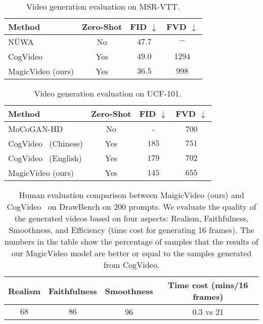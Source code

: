 \documentclass[10pt,twocolumn,letterpaper]{article}
\begin{document}
\begin{table}[t]
\small
\caption{Video generation evaluation on MSR-VTT. }
\label{tab:msrvtt}
\centering
\begin{tabular}{@{}l|ccc@{}}
Method & Zero-Shot  & FID $\downarrow$ & FVD $\downarrow$  \\
\toprule
NÜWA~\cite{wu2022nuwa} & No &  $47.7$ & $-$ \\
CogVideo~\cite{CogVideo}  & Yes &  $49.0$ & $1294$ \\
MagicVideo (ours) & Yes & $36.5$ & $998$ \\
\end{tabular}
\end{table}



\begin{table}[h]
\small
\caption{Video generation evaluation on UCF-101. }
\label{tab:ucf101}
\centering
\begin{tabular}{@{}l|ccc@{}}
Method & Zero-Shot  & FID $\downarrow$ & FVD $\downarrow$  \\
\toprule
MoCoGAN-HD\cite{tian2021good} & No & - & 700 \\
CogVideo~\cite{CogVideo} (Chinese) & Yes &  $185$ & $751$ \\
CogVideo~\cite{CogVideo} (English) & Yes &  $179 $ & $702$ \\
MagicVideo (ours) & Yes  & $145$ & $655$ \\
\end{tabular}
\end{table}



\begin{table}[t]
\caption{Human evaluation comparison between MaigicVideo (ours) and CogVideo~\cite{CogVideo} on DrawBench \cite{imagen} on 200 prompts. We evaluate the quality of the generated videos based on four aspects: Realism, Faithfulness, Smoothness, and Efficiency (time cost for generating 16 frames). 
The numbers in the table show the percentage of samples that the results of our MagicVideo model are better or equal to the samples generated from CogVideo.}
\label{tab:eval_human}
\centering
\footnotesize
\begin{tabular}{cccc}
Realism & Faithfulness & Smoothness & Time cost (mins/16 frames) \\
\toprule
$68$ & $86$ & 96 & 0.3 vs 21\\ 
\end{tabular}
\end{table}
 
\end{document}
